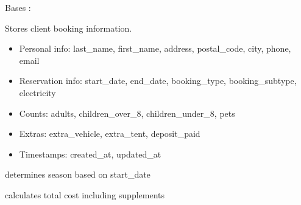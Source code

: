 \documentclass[letterpaper,10pt,french]{sphinxmanual}
\begin{document}

\begin{fulllineitems}
\label{\detokenize{index:bookings.models.Booking}}
\pysigstartsignatures
\pysiglinewithargsret
{}
{\sphinxparamcomma {}}
{}
\pysigstopsignatures
\sphinxAtStartPar
Bases : 

\sphinxAtStartPar
Stores client booking information.
\begin{description}
\begin{itemize}
\item {} 
\sphinxAtStartPar
Personal info: last\_name, first\_name, address, postal\_code, city, phone, email

\item {} 
\sphinxAtStartPar
Reservation info: start\_date, end\_date, booking\_type, booking\_subtype, electricity

\item {} 
\sphinxAtStartPar
Counts: adults, children\_over\_8, children\_under\_8, pets

\item {} 
\sphinxAtStartPar
Extras: extra\_vehicle, extra\_tent, deposit\_paid

\item {} 
\sphinxAtStartPar
Timestamps: created\_at, updated\_at

\end{itemize}

\end{description}


\begin{fulllineitems}

\pysigstartsignatures
\pysigline
{}
\pysigstopsignatures
\sphinxAtStartPar
determines season based on start\_date

\end{fulllineitems}



\begin{fulllineitems}

\pysigstartsignatures
\pysigline
{}
\pysigstopsignatures
\sphinxAtStartPar
calculates total cost including supplements


\end{fulllineitems}
\end{fulllineitems}
\end{document}
